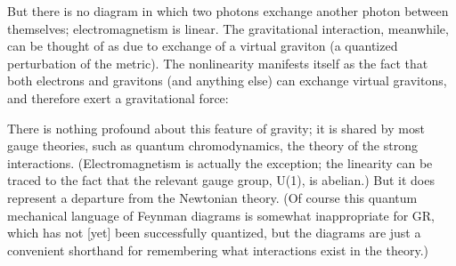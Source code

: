 \begin{figure}[h]
  \centerline{
  }
\end{figure}

\noindent But there is no diagram in which two photons exchange
another photon between themselves; electromagnetism is linear.
The gravitational interaction, meanwhile, can be thought of as due
to exchange of a virtual graviton (a quantized perturbation of the
metric).  The nonlinearity manifests itself as the fact that both
electrons and gravitons (and anything else) can exchange virtual
gravitons, and therefore exert a gravitational force:

\begin{figure}[h]
  \centerline{
  }
\end{figure}

\noindent There is nothing profound about this feature of gravity;
it is shared by most gauge theories, such as quantum chromodynamics,
the theory of the strong interactions.  (Electromagnetism is 
actually the exception; the linearity can be traced to the fact 
that the relevant gauge group, U(1), is abelian.)  But it does
represent a departure from the Newtonian theory.  (Of course this
quantum mechanical language of Feynman diagrams is somewhat 
inappropriate for GR, which has not [yet] been successfully quantized,
but the diagrams are just a convenient shorthand for remembering
what interactions exist in the theory.)
 
